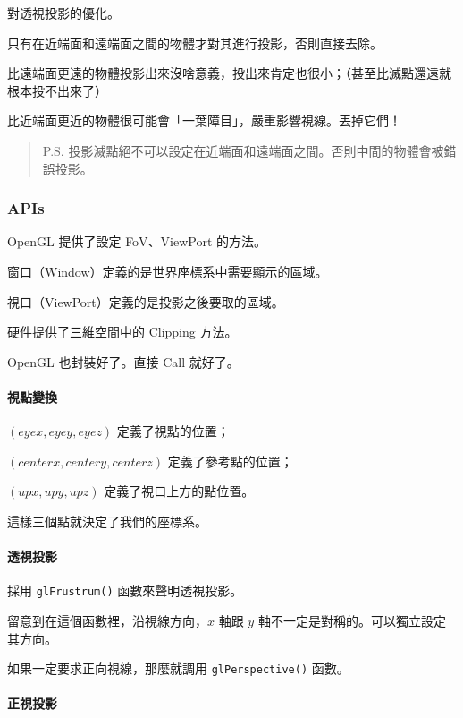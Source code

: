 \documentclass[
]{article}
\begin{document}
對透視投影的優化。

只有在近端面和遠端面之間的物體才對其進行投影，否則直接去除。

比遠端面更遠的物體投影出來沒啥意義，投出來肯定也很小；（甚至比滅點還遠就根本投不出來了）

比近端面更近的物體很可能會「一葉障目」，嚴重影響視線。丟掉它們！

\begin{quote}
P.S.
投影滅點絕不可以設定在近端面和遠端面之間。否則中間的物體會被錯誤投影。
\end{quote}

\hypertarget{header-n83}{%
\subsubsection{APIs}\label{header-n83}}

OpenGL 提供了設定 FoV、ViewPort 的方法。

窗口（Window）定義的是世界座標系中需要顯示的區域。

視口（ViewPort）定義的是投影之後要取的區域。

硬件提供了三維空間中的 Clipping 方法。

OpenGL 也封裝好了。直接 Call 就好了。

\hypertarget{header-n89}{%
\paragraph{視點變換}\label{header-n89}}

\((eyex, eyey, eyez)\) 定義了視點的位置；

\((centerx, centery, centerz)\) 定義了參考點的位置；

\((upx, upy, upz)\) 定義了視口上方的點位置。

這樣三個點就決定了我們的座標系。

\hypertarget{header-n94}{%
\paragraph{透視投影}\label{header-n94}}

採用 \texttt{glFrustrum()} 函數來聲明透視投影。

留意到在這個函數裡，沿視線方向，\(x\) 軸跟 \(y\)
軸不一定是對稱的。可以獨立設定其方向。

如果一定要求正向視線，那麼就調用 \texttt{glPerspective()} 函數。

\hypertarget{header-n98}{%
\paragraph{正視投影}\label{header-n98}}
\end{document}
